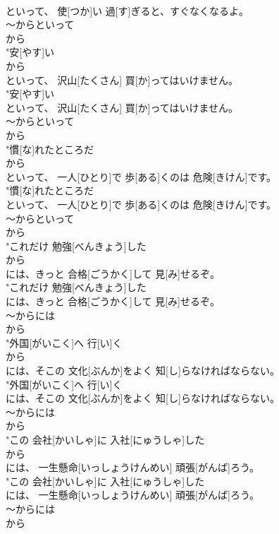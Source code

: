 \documentclass[8pt]{extreport}
\begin{document}
\begin{CJK}{UTF8}{min}
\\	といって、 使[つか]い 過[す]ぎると、すぐなくなるよ。
\\	～からといって	
\\	から
\\	"安[やす]い
\\	から
\\	といって、 沢山[たくさん] 買[か]ってはいけません。
\\	"安[やす]い
\\	といって、 沢山[たくさん] 買[か]ってはいけません。
\\	～からといって	
\\	から
\\	"慣[な]れたところだ
\\	から
\\	といって、 一人[ひとり]で 歩[ある]くのは 危険[きけん]です。
\\	"慣[な]れたところだ
\\	といって、 一人[ひとり]で 歩[ある]くのは 危険[きけん]です。
\\	～からといって	
\\	から
\\	"これだけ 勉強[べんきょう]した
\\	から
\\	には、きっと 合格[ごうかく]して 見[み]せるぞ。
\\	"これだけ 勉強[べんきょう]した
\\	には、きっと 合格[ごうかく]して 見[み]せるぞ。
\\	～からには	
\\	から
\\	"外国[がいこく]へ 行[い]く
\\	から
\\	には、そこの 文化[ぶんか]をよく 知[し]らなければならない。
\\	"外国[がいこく]へ 行[い]く
\\	には、そこの 文化[ぶんか]をよく 知[し]らなければならない。
\\	～からには	
\\	から
\\	"この 会社[かいしゃ]に 入社[にゅうしゃ]した
\\	から
\\	には、 一生懸命[いっしょうけんめい] 頑張[がんば]ろう。
\\	"この 会社[かいしゃ]に 入社[にゅうしゃ]した
\\	には、 一生懸命[いっしょうけんめい] 頑張[がんば]ろう。
\\	～からには	
\\	から

\end{CJK}
\end{document}
